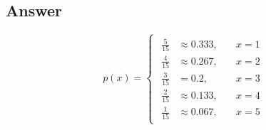 \documentclass[12pt]{article}
\begin{document}
\begin{enumerate}[label={},leftmargin=0in]
		\subsection*{Answer}
		
			\[\boxed{p(x) =
				\begin{cases}
					\begin{aligned}
						\frac{5}{15} &\approx 0.333,&\quad x = 1\\
						\frac{4}{15} &\approx 0.267,&\quad x = 2\\
						\frac{3}{15} &= 0.2,&\quad x = 3\\
						\frac{2}{15} &\approx 0.133,&\quad x = 4\\
						\frac{1}{15} &\approx 0.067,&\quad x = 5
					\end{aligned}
			\end{cases}}\]
	\end{enumerate}
	
\end{document}
